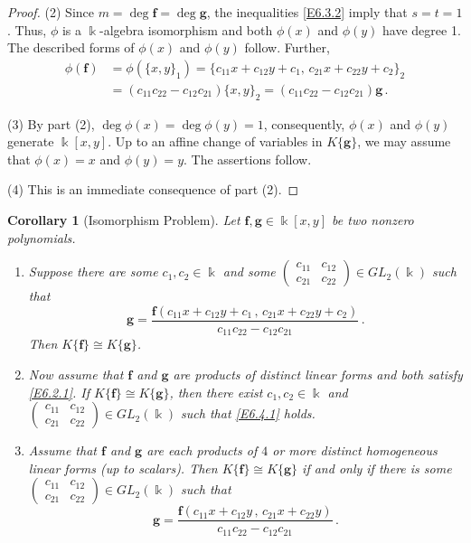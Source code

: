 \documentclass[12pt]{amsart}
\theoremstyle{plain}
\newtheorem{corollary}[theorem]{Corollary}
\numberwithin{theorem}{section}
\numberwithin{equation}{theorem}
\theoremstyle{definition}
\newcommand \bff {{\mathbf{f}}}
\newcommand \bfg {{\mathbf{g}}}
\begin{document}
\begin{proof}
(2) Since $m= \deg \bff=\deg \bfg$, the inequalities \eqref{E6.3.2} 
imply that $s=t=1$. Thus, $\phi$ is a $\Bbbk$-algebra isomorphism 
and both $\phi(x)$ and $\phi(y)$ have degree 1. The described forms of $\phi(x)$ and $\phi(y)$ follow.  Further,
\begin{align*}
\phi(\bff) &= \phi(\{x,y\}_1) = \{ c_{11}x+c_{12}y+c_1,\, c_{21}x+c_{22}y+c_2 \}_2  \\
&= (c_{11}c_{22} - c_{12}c_{21}) \{x,y\}_2 = (c_{11}c_{22} - c_{12}c_{21}) \bfg \,.
\end{align*}

(3) By part (2), $\deg \phi(x)=\deg 
\phi(y)=1$, consequently,
$\phi(x)$ and $\phi(y)$ generate
$\Bbbk[x,y]$. Up to an affine change of variables in $K\{\bfg\}$,
we may assume that $\phi(x)=x$ and $\phi(y)=y$. The assertions 
follow.

(4) This is an immediate consequence of part (2).
\end{proof}

\begin{corollary} [Isomorphism Problem]  \label{zzcor6.4}
Let $\bff,\bfg \in \Bbbk[x,y]$ be two nonzero polynomials.
\begin{enumerate}
\item[(1)]
Suppose there are some $c_1,c_2 \in \Bbbk$ and some $\begin{pmatrix} c_{11}&c_{12}\\  c_{21}&c_{22}\end{pmatrix} \in GL_2(\Bbbk)$ such that
\begin{equation}  \label{E6.4.1}  \tag{E6.4.1}
\bfg = \frac{\bff(c_{11}x+c_{12}y+c_1\,,\, c_{21}x+c_{22}y+c_2)}{c_{11}c_{22} - c_{12}c_{21}} \,.
\end{equation}
Then $K\{\bff\} \cong K\{\bfg\}$.
\item[(2)]
Now assume that $\bff$ and $\bfg$ are products of distinct linear forms and both satisfy \eqref{E6.2.1}.  If $K\{\bff\} \cong K\{\bfg\}$, then there exist $c_1,c_2 \in \Bbbk$ and $\begin{pmatrix} c_{11}&c_{12}\\  c_{21}&c_{22}\end{pmatrix} \in GL_2(\Bbbk)$ such that \eqref{E6.4.1} holds.
\item[(3)] 
Assume that $\bff$ and $\bfg$ are each products of $4$ or more distinct homogeneous linear forms {\rm(}up to scalars{\rm)}.  Then $K\{\bff\} \cong K\{\bfg\}$ if and only if there is some $\begin{pmatrix} c_{11}&c_{12}\\  c_{21}&c_{22}\end{pmatrix} \in GL_2(\Bbbk)$ such that 
$$
\bfg = \frac{\bff(c_{11}x+c_{12}y\,,\, c_{21}x+c_{22}y)}{c_{11}c_{22} - c_{12}c_{21}} \,.
$$
\end{enumerate}
\end{corollary}
\end{document}
